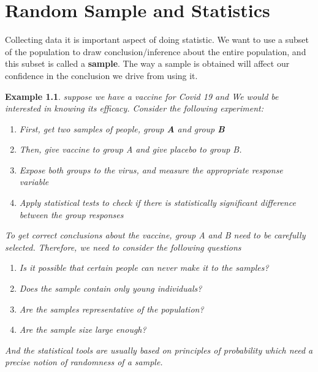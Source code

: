 \documentclass[11pt,oneside]{book}
\theoremstyle{newStyle}
\newtheorem{ex}{Example}[section]
\begin{document}
\chapter[Random Sample and Statistics]{Random Sample and Statistics}
Collecting data it is important aspect of doing statistic. We want to use a subset of the population to draw conclusion/inference about the entire population, and this subset is called a \textbf{sample}. The way a sample is obtained will affect our confidence in the conclusion we drive from using it.
\begin{ex}
suppose we have a vaccine for Covid 19 and We would be interested in knowing its efficacy. Consider the following experiment:\begin{enumerate}
\item First, get two samples of people, group \textbf{A} and group \textbf{B}
\item Then, give vaccine to group A and give placebo to group B.
\item Expose both groups to the virus, and measure the appropriate response variable
\item Apply statistical tests to check if there is statistically significant difference between the group responses 
\end{enumerate}
To get correct conclusions about the vaccine, group A and B need to be carefully selected. Therefore, we need to consider the following questions\begin{enumerate}[itemsep=0pt, topsep=1pt, partopsep=0pt,label=(\roman*)]
\item Is it possible that certain people can never make it to the samples?
\item Does the sample contain only young individuals?
\item Are the samples representative of the population?
\item Are the sample size large enough?
\end{enumerate}
And the statistical tools are usually based on principles of probability which need a precise notion of randomness of a sample.
\end{ex}
\end{document}
